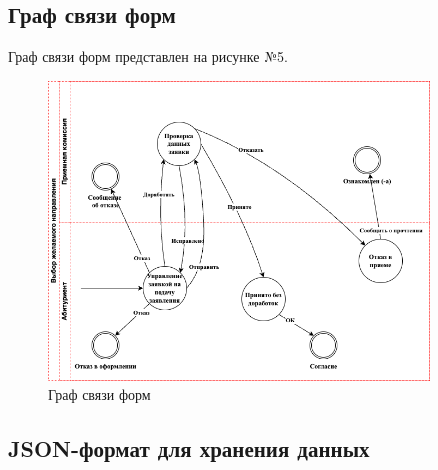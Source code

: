 \documentclass[areasetadvanced]{scrartcl}
\begin{document}
\subsection{Граф связи форм}
Граф связи форм представлен на рисунке №5.
\begin{figure}[H]
    \centering
    \includegraphics[width=0.9\textwidth]{images/GraphProject.png}
    \caption{Граф связи форм}
    \label{fig:syntdiag}
\end{figure}

\newpage
\subsection{JSON-формат для хранения данных}
\end{document}
